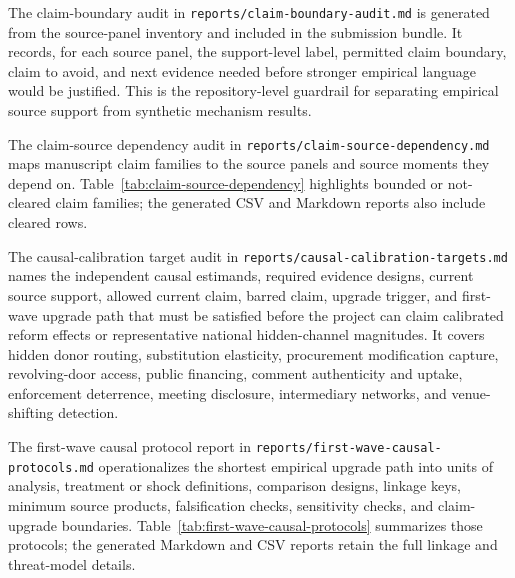 The claim-boundary audit in \texttt{reports/claim-boundary-audit.md} is generated from the source-panel inventory and included in the submission bundle. It records, for each source panel, the support-level label, permitted claim boundary, claim to avoid, and next evidence needed before stronger empirical language would be justified. This is the repository-level guardrail for separating empirical source support from synthetic mechanism results.

The claim-source dependency audit in \texttt{reports/claim-source-dependency.md} maps manuscript claim families to the source panels and source moments they depend on. Table~\ref{tab:claim-source-dependency} highlights bounded or not-cleared claim families; the generated CSV and Markdown reports also include cleared rows.



The causal-calibration target audit in \texttt{reports/causal-calibration-targets.md} names the independent causal estimands, required evidence designs, current source support, allowed current claim, barred claim, upgrade trigger, and first-wave upgrade path that must be satisfied before the project can claim calibrated reform effects or representative national hidden-channel magnitudes. It covers hidden donor routing, substitution elasticity, procurement modification capture, revolving-door access, public financing, comment authenticity and uptake, enforcement deterrence, meeting disclosure, intermediary networks, and venue-shifting detection.

The first-wave causal protocol report in \texttt{reports/first-wave-causal-protocols.md} operationalizes the shortest empirical upgrade path into units of analysis, treatment or shock definitions, comparison designs, linkage keys, minimum source products, falsification checks, sensitivity checks, and claim-upgrade boundaries. Table~\ref{tab:first-wave-causal-protocols} summarizes those protocols; the generated Markdown and CSV reports retain the full linkage and threat-model details.



